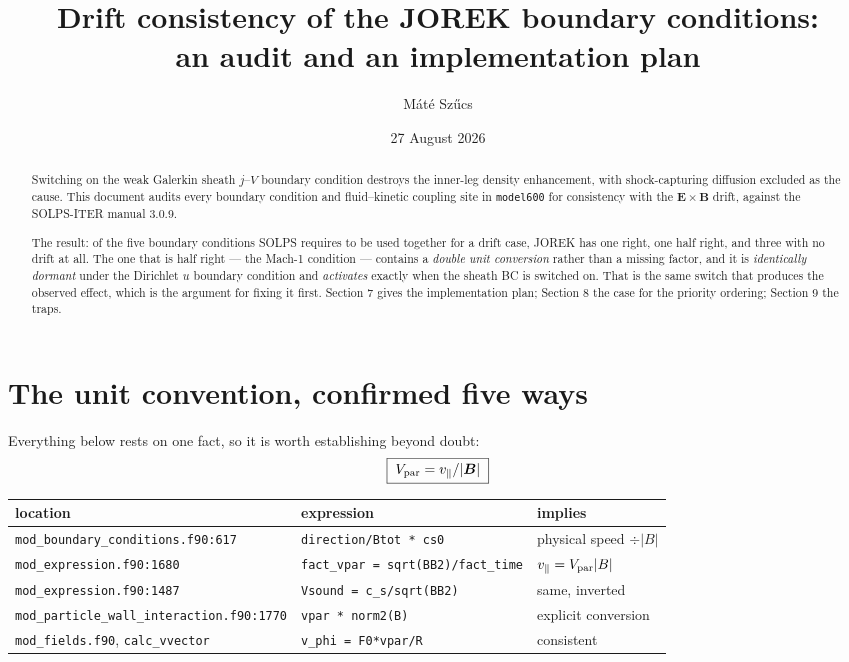 \documentclass[11pt,a4paper]{article}
\title{\vspace{-1.5cm}Drift consistency of the JOREK \code{model600} boundary conditions:\\
       an audit and an implementation plan}
\author{Máté Szűcs}
\date{27 August 2026}
\newcommand{\code}[1]{\texttt{\small #1}}
\begin{document}
\maketitle

\begin{abstract}
\noindent
Switching on the weak Galerkin sheath $j$--$V$ boundary condition destroys the inner-leg
density enhancement, with shock-capturing diffusion excluded as the cause. This document
audits every boundary condition and fluid--kinetic coupling site in \code{model600} for
consistency with the $\bm E\times\bm B$ drift, against the SOLPS-ITER manual 3.0.9.

The result: of the five boundary conditions SOLPS requires to be used together for a
drift case, JOREK has one right, one half right, and three with no drift at all. The one
that is half right --- the Mach-1 condition --- contains a \emph{double unit conversion}
rather than a missing factor, and it is \emph{identically dormant} under the Dirichlet
$u$ boundary condition and \emph{activates} exactly when the sheath BC is switched on.
That is the same switch that produces the observed effect, which is the argument for
fixing it first. Section 7 gives the implementation plan; Section 8 the case for the
priority ordering; Section 9 the traps.
\end{abstract}

\section{The unit convention, confirmed five ways}

Everything below rests on one fact, so it is worth establishing beyond doubt:
\begin{equation}
  \boxed{\;V_{\rm par} = v_\parallel / |\bm B|\;}
\end{equation}
\begin{center}
\begin{tabular}{lll}
\toprule
location & expression & implies \\
\midrule
\code{mod\_boundary\_conditions.f90:617} & \code{direction/Btot * cs0} & physical speed $\div|B|$ \\
\code{mod\_expression.f90:1680} & \code{fact\_vpar = sqrt(BB2)/fact\_time} & $v_\parallel = V_{\rm par}|B|$ \\
\code{mod\_expression.f90:1487} & \code{Vsound = c\_s/sqrt(BB2)} & same, inverted \\
\code{mod\_particle\_wall\_interaction.f90:1770} & \code{vpar * norm2(B)} & explicit conversion \\
\code{mod\_fields.f90}, \code{calc\_vvector} & \code{v\_phi = F0*vpar/R} & consistent \\
\bottomrule
\end{tabular}
\end{center}
\end{document}
